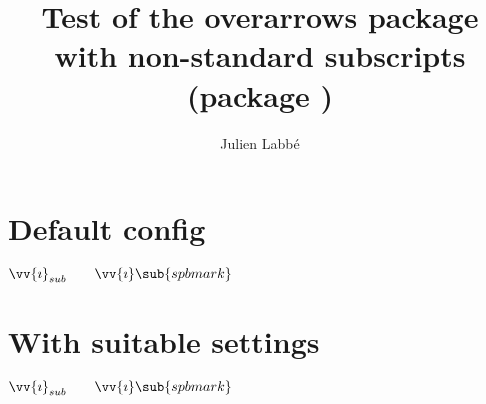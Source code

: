 \documentclass{article}
\title{Test of the \textsf{overarrows} package\\with non-standard subscripts
  (package \pkg{spbmark})}
\author{Julien Labb\'e}
\begin{document}
\maketitle

\section{Default config}

\begin{dispExample}
$ \vv{\imath}_{sub} \qquad \vv{\imath}\sub{spbmark}$
\end{dispExample}

\section{With suitable settings}

\begin{dispExample}
\SetOverArrowsSubscriptCommand{\sub}
$ \vv{\imath}_{sub} \qquad \vv{\imath}\sub{spbmark}$
\end{dispExample}
\end{document}
